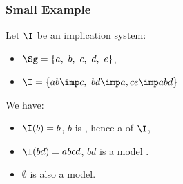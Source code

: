 \begin{frame}
\frametitle{Small Example}

Let $\I$ be an implication system:
\begin{itemize}
\item $\Sg = \{ a, \ b, \ c, \ d, \ e \}$,
\item $\I = \{ ab \imp c, \ bd \imp a, ce \imp abd \}$
\end{itemize}

\vspace{1.2em}

We have:
\begin{itemize}
\item $\I(b) = b$, $b$ is , hence a  of $\I$,
\item $\I(bd) = abcd$, $bd$ is  a model \quad 
{}.
\item $\emptyset$ is also a model.
\end{itemize}

\end{frame}


